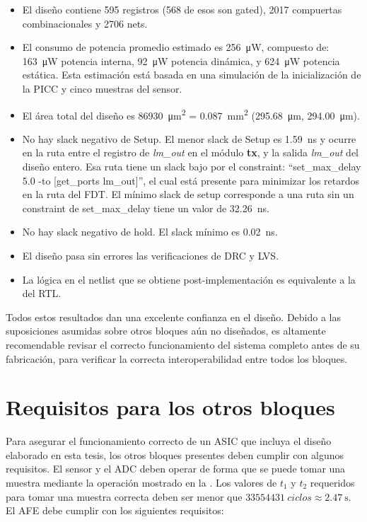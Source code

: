 \documentclass[a4paper, twoside, 11pt]{report}
\begin{document}
\begin{itemize}
  \item El diseño contiene 595 registros (568 de esos son gated), 2017 compuertas combinacionales y 2706 nets.
  \item El consumo de potencia promedio estimado es \SI{256}{\micro\watt}, compuesto de: \SI{163}{\micro\watt} potencia interna, \SI{92}{\micro\watt} potencia dinámica, y \SI{624}{\micro\watt} potencia estática. Esta estimación está basada en una simulación de la inicialización de la PICC y cinco muestras del sensor.
  \item El área total del diseño es \SI{86930}{\micro\meter\squared} = \SI{0.087}{\milli\meter\squared} (\SI{295.68}{\micro\meter}, \SI{294.00}{\micro\meter}).
  \item No hay slack negativo de Setup. El menor slack de Setup es \SI{1.59}{\nano\second} y ocurre en la ruta entre el registro de \textit{lm\_out} en el módulo \textbf{tx}, y la salida \textit{lm\_out} del diseño entero. Esa ruta tiene un slack bajo por el constraint: “set\_max\_delay 5.0 -to [get\_ports lm\_out]”, el cual está presente para minimizar los retardos en la ruta del FDT. El mínimo slack de setup corresponde a una ruta sin un constraint de set\_max\_delay tiene un valor de \SI{32.26}{\nano\second}.
  \item No hay slack negativo de hold. El slack mínimo es \SI{0.02}{\nano\second}.
  \item El diseño pasa sin errores las verificaciones de DRC y LVS.
  \item La lógica en el netlist que se obtiene post-implementación es equivalente a la del RTL.
\end{itemize}

Todos estos resultados dan una excelente confianza en el diseño. Debido a las suposiciones asumidas sobre otros bloques aún no diseñados, es altamente recomendable revisar el correcto funcionamiento del sistema completo antes de su fabricación, para verificar la correcta interoperabilidad entre todos los bloques.

\FloatBarrier
\section{Requisitos para los otros bloques}

Para asegurar el funcionamiento correcto de un ASIC que incluya el diseño elaborado en esta tesis, los otros bloques presentes deben cumplir con algunos requisitos. El sensor y el ADC deben operar de forma que se puede tomar una muestra mediante la operación mostrado en la . Los valores de $t_1$ y $t_2$ requeridos para tomar una muestra correcta deben ser menor que $\SI{33554431}{ciclos} \approx \SI{2.47}{\second}$. El AFE debe cumplir con los siguientes requisitos:
\end{document}
